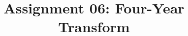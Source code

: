 \documentclass{article}
\title{Assignment 06: Four-Year Transform}
\begin{document}
\renderTitle
\end{document}
